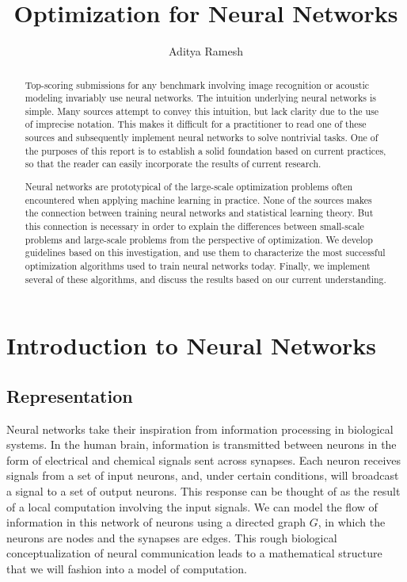 \documentclass[11pt,a4paper]{article}
\title{Optimization for Neural Networks}
\author{Aditya Ramesh}
\date{}
\numberwithin{equation}{section}
\begin{document}
\maketitle
\begin{abstract}
Top-scoring submissions for any benchmark involving image recognition or
acoustic modeling invariably use neural networks. The intuition underlying
neural networks is simple. Many sources attempt to convey this intuition, but
lack clarity due to the use of imprecise notation. This makes it difficult for a
practitioner to read one of these sources and subsequently implement neural
networks to solve nontrivial tasks. One of the purposes of this report is to
establish a solid foundation based on current practices, so that the reader can
easily incorporate the results of current research.

Neural networks are prototypical of the large-scale optimization problems often
encountered when applying machine learning in practice. None of the sources
makes the connection between training neural networks and statistical learning
theory. But this connection is necessary in order to explain the differences
between small-scale problems and large-scale problems from the perspective of
optimization. We develop guidelines based on this investigation, and use them to
characterize the most successful optimization algorithms used to train neural
networks today. Finally, we implement several of these algorithms, and discuss
the results based on our current understanding.
\end{abstract}

\section{Introduction to Neural Networks}
\subsection{Representation}
\label{sec:representation}

Neural networks take their inspiration from information processing in biological
systems. In the human brain, information is transmitted between neurons in the
form of electrical and chemical signals sent across synapses. Each neuron
receives signals from a set of input neurons, and, under certain conditions,
will broadcast a signal to a set of output neurons. This response can be thought
of as the result of a local computation involving the input signals. We can
model the flow of information in this network of neurons using a directed graph
$G$, in which the neurons are nodes and the synapses are edges. This rough
biological conceptualization of neural communication leads to a mathematical
structure that we will fashion into a model of computation.
\end{document}
